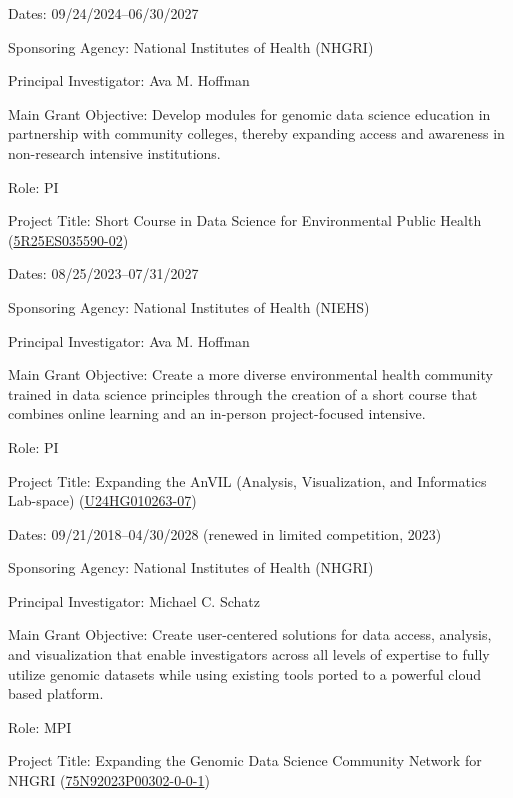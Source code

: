 \documentclass{cv}
\begin{document}
Dates: 09/24/2024--06/30/2027

Sponsoring Agency: National Institutes of Health (NHGRI)

Principal Investigator: Ava M. Hoffman

Main Grant Objective: Develop modules for genomic data science education in partnership with community colleges, thereby expanding access and awareness in non-research intensive institutions.

Role: PI

\vspace{5mm}

Project Title: Short Course in Data Science for Environmental Public Health (\href{https://reporter.nih.gov/search/n8pPuYzcskWEltb40MVBkA/project-details/10746327}{5R25ES035590-02})

Dates: 08/25/2023--07/31/2027

Sponsoring Agency: National Institutes of Health (NIEHS)

Principal Investigator: Ava M. Hoffman

Main Grant Objective: Create a more diverse environmental health community trained in data science principles through the creation of a short course that combines online learning and an in-person project-focused intensive.

Role: PI

\vspace{5mm}

Project Title: Expanding the AnVIL (Analysis, Visualization, and Informatics Lab-space) (\href{https://reporter.nih.gov/search/n8pPuYzcskWEltb40MVBkA/project-details/10748042}{U24HG010263-07})

Dates: 09/21/2018--04/30/2028 (renewed in limited competition, 2023)

Sponsoring Agency: National Institutes of Health (NHGRI)

Principal Investigator: Michael C. Schatz

Main Grant Objective: Create user-centered solutions for data access, analysis, and visualization that enable investigators across all levels of expertise to fully utilize genomic datasets while using existing tools ported to a powerful cloud based platform.

Role: MPI

\vspace{5mm}

Project Title: Expanding the Genomic Data Science Community Network for NHGRI (\href{https://reporter.nih.gov/search/hBYvgxL2yUO5iw9lGMoYTA/project-details/10944109}{75N92023P00302-0-0-1})
\end{document}
